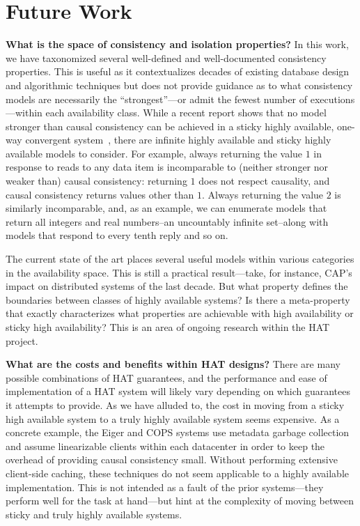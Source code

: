
\section{Future Work}
\label{sec:futurework}

\textbf{What is the space of consistency and isolation properties?} In
this work, we have taxonomized several well-defined and
well-documented consistency properties. This is useful as it
contextualizes decades of existing database design and algorithmic
techniques but does not provide guidance as to what consistency models
are necessarily the ``strongest''---or admit the fewest number of
executions---within each availability class. While a recent report
shows that no model stronger than causal consistency can be achieved
in a sticky highly available, one-way convergent system~\cite{cac},
there are infinite highly available and sticky highly available models
to consider. For example, always returning the value $1$ in response
to reads to any data item is incomparable to (neither stronger nor
weaker than) causal consistency: returning $1$ does not respect
causality, and causal consistency returns values other than
$1$. Always returning the value $2$ is similarly incomparable, and, as
an example, we can enumerate models that return all integers and real
numbers--an uncountably infinite set--along with models that respond
to every tenth reply and so on.

The current state of the art places several useful models within
various categories in the availability space. This is still a
practical result---take, for instance, CAP's impact on distributed
systems of the last decade. But what property defines the boundaries
between classes of highly available systems? Is there a meta-property
that exactly characterizes what properties are achievable with high
availability or sticky high availability? This is an area of ongoing
research within the HAT project.

\textbf{What are the costs and benefits within HAT designs?} There are
many possible combinations of HAT guarantees, and the performance and
ease of implementation of a HAT system will likely vary depending on
which guarantees it attempts to provide. As we have alluded to, the
cost in moving from a sticky high available system to a truly highly
available system seems expensive. As a concrete example, the Eiger and
COPS systems use metadata garbage collection and assume linearizable
clients within each datacenter in order to keep the overhead of
providing causal consistency small. Without performing extensive
client-side caching, these techniques do not seem applicable to a
highly available implementation. This is not intended as a fault of
the prior systems---they perform well for the task at hand---but hint
at the complexity of moving between sticky and truly highly available
systems.

